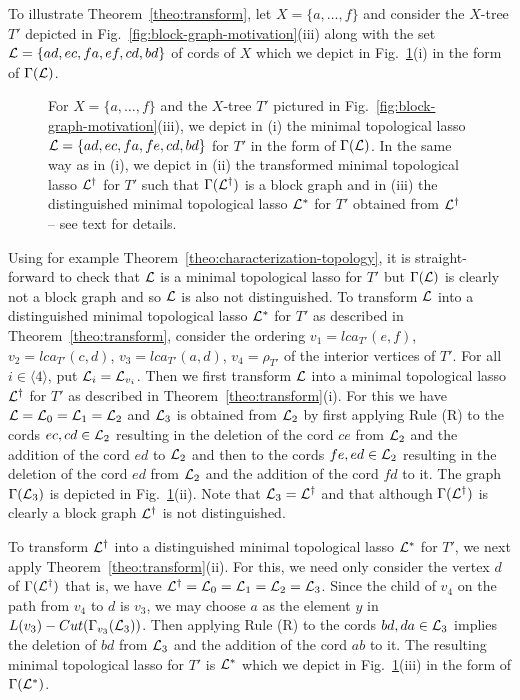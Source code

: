 To illustrate Theorem~\ref{theo:transform}, let 
$X=\{a,\ldots, f\}$ and consider the
$X$-tree $T'$ depicted in Fig.~\ref{fig:block-graph-motivation}(iii) 
along with the
set ${\mathcal L}=\{ad,ec,fa,ef,cd,bd\}$ of cords of $X$ which we depict in
Fig.~\ref{fig:transformation}(i) in the form of $\Gamma({\mathcal L})$.
%
\begin{figure}[h]
\begin{center}

\end{center}
\caption{\label{fig:transformation}
For $X=\{a,\ldots, f\}$ 
and the $X$-tree $T'$ pictured in Fig.~\ref{fig:block-graph-motivation}(iii),
we depict in (i) the minimal topological lasso ${\mathcal L}=\{ad,ec,fa,fe,cd,bd\}$ 
for $T'$  in the form of $\Gamma({\mathcal L})$. 
In the same way as in (i), we depict in (ii) 
the transformed minimal topological lasso ${\mathcal L}^{\dagger}$ for $T'$ such that
$\Gamma({\mathcal L}^{\dagger})$  is a block graph and in  (iii) the
distinguished minimal topological lasso ${\mathcal L}^*$ for $T'$ obtained from
${\mathcal L}^{\dagger}$ -- see text for details. 
}
\end{figure}
%
Using for example Theorem~\ref{theo:characterization-topology},
it is straight-forward to check that ${\mathcal L}$ is a minimal
topological lasso for $T'$ but $\Gamma({\mathcal L})$ is clearly not a block graph 
and so ${\mathcal L}$ is also not distinguished. To transform ${\mathcal L}$ into
a distinguished minimal topological lasso ${\mathcal L}^*$
for $T'$ as described in Theorem~\ref{theo:transform}, consider the ordering 
$v_1=lca_{T'}(e,f)$, $v_2=lca_{T'}(c,d)$, $v_3=lca_{T'}(a,d)$, $v_4=\rho_{T'}$
of the interior vertices of $T'$. For all $i\in\langle 4\rangle$, 
put ${\mathcal L}_i={\mathcal L}_{v_i}$. Then we first transform ${\mathcal L}$ into a minimal
topological lasso ${\mathcal L}^{\dagger}$ for $T'$ as described in 
Theorem~\ref{theo:transform}(i). For this we
have ${\mathcal L}={\mathcal L}_0={\mathcal L}_1={\mathcal L}_2$
and ${\mathcal L}_3$ is obtained from ${\mathcal L}_2$ by first applying Rule (R) to 
the cords $ec, cd \in {\mathcal L}_2$ resulting in the deletion of the
cord $ce$ from ${\mathcal L}_2 $ and the addition of the cord $ed$ to ${\mathcal L}_2$
and then to the cords $fe,ed\in{\mathcal L}_2$  resulting in the 
deletion of the cord $ed$ from ${\mathcal L}_2$ and the addition of the cord
$fd$ to it. The graph $\Gamma({\mathcal L}_3)$ is  depicted in 
Fig.~\ref{fig:transformation}(ii). 
Note that ${\mathcal L}_3={\mathcal L}^{\dagger}$ and that although $\Gamma({\mathcal L}^{\dagger})$
is clearly a block graph ${\mathcal L}^{\dagger}$ is not distinguished. 

To transform
${\mathcal L}^{\dagger}$ into a distinguished minimal topological lasso ${\mathcal L}^*$ 
for $T'$, we next apply Theorem~\ref{theo:transform}(ii). For this, we
need only consider the vertex $d$ of $\Gamma({\mathcal L}^{\dagger})$ that is, we 
have ${\mathcal L}^{\dagger}={\mathcal L}_0={\mathcal L}_1={\mathcal L}_2={\mathcal L}_3$.
Since the child of $v_4$ on the path from $v_4$ to $d$ is 
$v_3$, we may choose $a$ as the element $y$
in $L(v_3)-Cut(\Gamma_{v_3}({\mathcal L}_3))$. Then applying Rule (R)
to the cords $bd,da\in {\mathcal L}_3$ implies the deletion of $bd$ from ${\mathcal L}_3$
and the addition of the cord $ab$ to it. The resulting minimal topological lasso
for $T'$ is ${\mathcal L}^*$ which we depict in Fig.~\ref{fig:transformation}(iii)
in the form of $\Gamma({\mathcal L}^*)$.
 
